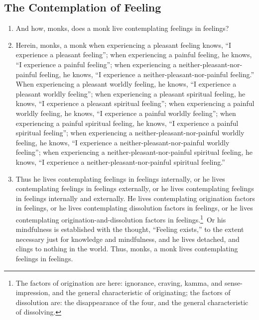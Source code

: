 \documentclass[a4 paper, 12pt]{article}
\begin{document}
\subsection*{The Contemplation of Feeling}
\begin{enumerate}[resume]
\item And how, monks, does a monk live contemplating feelings in feelings?
\item Herein, monks, a monk when experiencing a pleasant feeling knows, “I experience a pleasant feeling”; when experiencing a painful feeling, he knows, “I experience a painful feeling”; when experiencing a neither-pleasant-nor-painful feeling, he knows, “I experience a neither-pleasant-nor-painful feeling.” When experiencing a pleasant worldly feeling, he knows, “I experience a pleasant worldly feeling”; when experiencing a pleasant spiritual feeling, he knows, “I experience a pleasant spiritual feeling”; when experiencing a painful worldly feeling, he knows, “I experience a painful worldly feeling”; when experiencing a painful spiritual feeling, he knows, “I experience a painful spiritual feeling”; when experiencing a neither-pleasant-nor-painful worldly feeling, he knows, “I experience a neither-pleasant-nor-painful worldly feeling”; when experiencing a neither-pleasant-nor-painful spiritual feeling, he knows, “I experience a neither-pleasant-nor-painful spiritual feeling.”
\item Thus he lives contemplating feelings in feelings internally, or he lives contemplating feelings in feelings externally, or he lives contemplating feelings in feelings internally and externally. He lives contemplating origination factors in feelings, or he lives contemplating dissolution factors in feelings, or he lives contemplating origination-and-dissolution factors in feelings.\footnote{The factors of origination are here: ignorance, craving, kamma, and sense-impression, and the general characteristic of originating; the factors of dissolution are: the disappearance of the four, and the general characteristic of dissolving.} Or his mindfulness is established with the thought, “Feeling exists,” to the extent necessary just for knowledge and mindfulness, and he lives detached, and clings to nothing in the world. Thus, monks, a monk lives contemplating feelings in feelings.
\end{enumerate}
\end{document}

